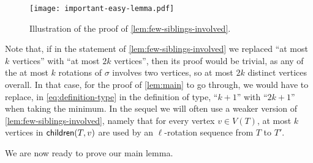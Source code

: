 \documentclass[a4paper,UKenglish,cleveref, autoref, thm-restate]{lipics-v2021}
\newcommand{\child}{{\sf children}\xspace}
\begin{document}
\begin{figure}[h!tb]
    \centering
    \vspace{-.3cm}
    \texttt{[image: important-easy-lemma.pdf]}
    \caption{Illustration of the proof of \autoref{lem:few-siblings-involved}.\label{fig:important-easy-lemma}}
\end{figure}



Note that, if in the statement of \autoref{lem:few-siblings-involved} we replaced ``at most $k$ vertices'' with ``at most $2k$ vertices'', then its proof would be trivial, as any of the at most $k$ rotations of $\sigma$ involves two vertices, so at most $2k$ distinct vertices overall. In that case, for the proof of \autoref{lem:main} to go through,  we would have to replace, in \autoref{eq:definition-type} in the definition of type, ``$k+1$'' with ``$2k+1$'' when taking the minimum. In the sequel we will often use a weaker version of \autoref{lem:few-siblings-involved}, namely that for every vertex $v \in V(T)$, at most $k$ vertices in $\child(T,v)$ are used by an $\ell$-rotation sequence from $T$ to $T'$.



We are now ready to prove our main lemma.
\end{document}
